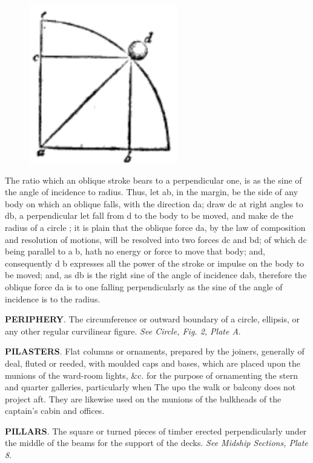 \begin{figure}
\begin{center}
\includegraphics[scale=0.5]{pictures/percussion}
\end{center}
\end{figure}
The ratio which an oblique stroke bears to a perpendicular one, is as the sine of the angle of incidence to radius. Thus, let ab, in the margin, be the side of any body on which an oblique falls, with the direction da; draw dc at right angles to db, a perpendicular let fall from d to the body to be moved, and make de the radius of a circle ; it is plain that the oblique force da, by the law of composition and resolution of motions, will be resolved into two forces dc and bd; of which dc being parallel to a b, hath no energy or force to move that body; and, consequently d b expresses all the power of the stroke or impulse on the body to be moved; and, as db is the right sine of the angle of incidence dab, therefore the oblique force da is to one falling perpendicularly as the sine of the angle of incidence is to the radius. 

\textbf{PERIPHERY}. The circumference or outward boundary of a circle, ellipsis, or any other regular curvilinear figure. \textit{See Circle, Fig. 2, Plate A}. 

\textbf{PILASTERS}. Flat columns or ornaments, prepared by the joiners, generally of deal, fluted or reeded, with moulded caps and bases, which are placed upon the munions of the ward-room lights, \&c. for the purpose of ornamenting the stern and quarter galleries, particularly when The upo the walk or balcony does not project aft. They are likewise used on the munions of the bulkheads of the captain's cabin and offices. 

\textbf{PILLARS}. The square or turned pieces of timber erected perpendicularly under the middle of the beams for the support of the decks. \textit{See Midship Sections, Plate 8}. 

